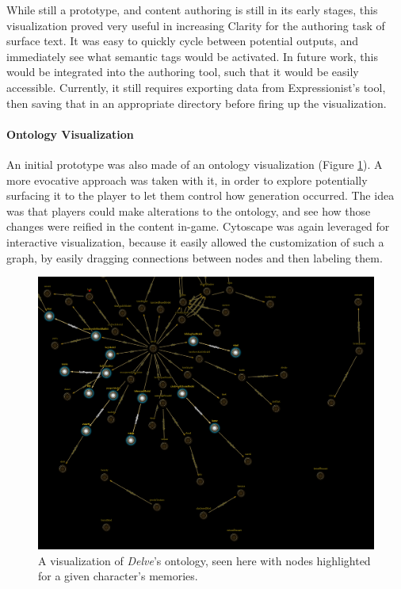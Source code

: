 
While still a prototype, and content authoring is still in its early stages, this visualization proved very useful in increasing Clarity for the authoring task of surface text. It was easy to quickly cycle between potential outputs, and immediately see what semantic tags would be activated. In future work, this would be integrated into the authoring tool, such that it would be easily accessible. Currently, it still requires exporting data from Expressionist's tool, then saving that in an appropriate directory before firing up the visualization.

\paragraph{Ontology Visualization}\label{par:delve-ontology-visualization}

An initial prototype was also made of an ontology visualization (Figure \ref{fig:ontology-viz}). A more evocative approach was taken with it, in order to explore potentially surfacing it to the player to let them control how generation occurred. The idea was that players could make alterations to the ontology, and see how those changes were reified in the content in-game. Cytoscape \cite{cytoscape} was again leveraged for interactive visualization, because it easily allowed the customization of such a graph, by easily dragging connections between nodes and then labeling them. 


\begin{figure}
    \centering
    \includegraphics[width=\textwidth]{figures/4-Delve/substrate.png}
    \caption{A visualization of \textit{Delve}'s ontology, seen here with nodes highlighted for a given character's memories.}
    \label{fig:ontology-viz}
\end{figure}

